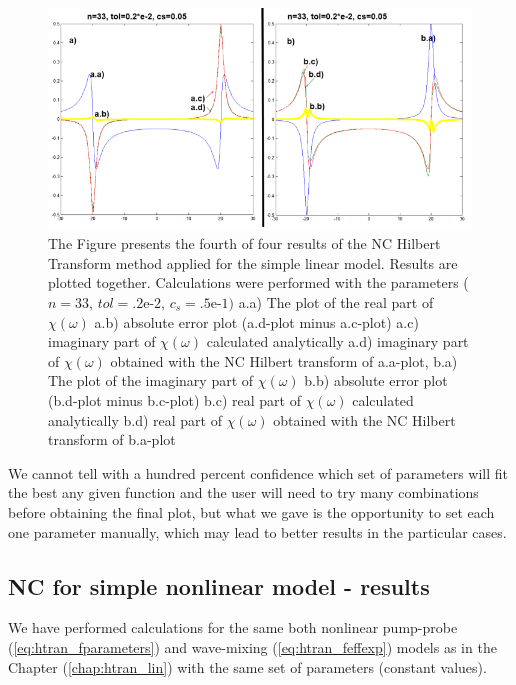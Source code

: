 \documentclass[12pt,twoside,a4paper]{article}
\numberwithin{equation}{subsection}
\numberwithin{figure}{subsection}
\begin{document}
\begin{figure}
  \includegraphics[width=150mm]{img/nc_lin4.png}
  \caption{The Figure presents the fourth of four results of the NC Hilbert Transform method applied for the simple linear model. Results
   are plotted together. Calculations were performed with the parameters ($n = 33, \, tol = \mbox{.2e-2}, \, c_s = \mbox{.5e-1}) $
    a.a) The plot of the real part of $\chi (\omega )$
    a.b) absolute error plot (a.d-plot minus a.c-plot) 
    a.c) imaginary part of $\chi (\omega )$ calculated analytically 
    a.d) imaginary part of $\chi (\omega )$ obtained with the NC Hilbert transform of a.a-plot,
    b.a) The plot of the imaginary part of $\chi (\omega )$
    b.b) absolute error plot (b.d-plot minus b.c-plot) 
    b.c) real part of $\chi (\omega )$ calculated analytically 
    b.d) real part of $\chi (\omega )$ obtained with the NC Hilbert transform of b.a-plot
    \label{fig:nc_lin4} 
    }
\end{figure}

We cannot tell with a hundred percent confidence which set of parameters will fit the best any given function and the user will
need to try many combinations before obtaining the final plot, but what we gave is the opportunity to set each one parameter manually,
which may lead to better results in the particular cases.

\subsection{NC for simple nonlinear model - results} \label{chap:nc_nlo}

We have performed calculations for the same both nonlinear pump-probe (\ref{eq:htran_fparameters}) and wave-mixing (\ref{eq:htran_feffexp})
models as in the Chapter (\ref{chap:htran_lin}) with the same set of parameters (constant values).
\end{document}
